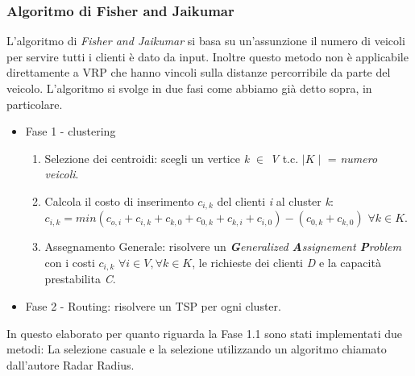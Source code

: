 \documentclass[]{article}
\begin{document}
\subsubsection{Algoritmo di Fisher and Jaikumar}
L'algoritmo di \emph{Fisher and Jaikumar} si basa su un'assunzione il numero di veicoli per servire tutti i clienti è dato da input.
Inoltre questo metodo non è applicabile direttamente a VRP che hanno vincoli sulla distanze percorribile da parte del veicolo.
L'algoritmo si svolge in due fasi come abbiamo già detto sopra, in particolare.
\begin{itemize}
 \item Fase 1 - clustering
 	\begin{enumerate}
		\item Selezione dei centroidi: scegli un vertice \emph{k} $\in$ \emph{V} t.c. $\mid K \mid$ = \emph{numero veicoli}.
		\item Calcola il costo di inserimento $c_{i,k}$ del clienti \emph{i} al cluster \emph{k}: \\
		$c_{i,k} = min(c_{o,i} + c_{i,k}+ c_{k,0} + c_{0,k} + c_{k,i} + c_{i,0}) - (c_{0,k} + c_{k,0})  $ $ \forall k \in K$.
		\item Assegnamento Generale: risolvere un \emph{\textbf{G}eneralized \textbf{A}ssignement \textbf{P}roblem} con i costi $c_{i,k} $ $ \forall i \in V , \forall k \in K$, le richieste dei clienti \emph{D} e la capacità prestabilita \emph{C}.
 	\end{enumerate}
 \item Fase 2 - Routing: risolvere un TSP per ogni cluster.
 
\end{itemize}

In questo elaborato per quanto riguarda la Fase 1.1 sono stati implementati due metodi: La selezione casuale e la selezione utilizzando un algoritmo chiamato dall'autore Radar Radius.
\end{document}
